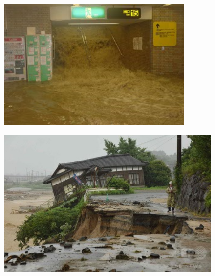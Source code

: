 \documentclass[12pt,dvipdfmx]{beamer}
\begin{document}
{\begin{minipage}{0.6\columnwidth}
\begin{beamerboxesrounded}
\begin{itemize}
        \end{itemize}
      \end{beamerboxesrounded}
      \end{minipage}
      \begin{minipage}{0.39\columnwidth}
        \centering
        \bigskip
        \begin{figure}[htbp]
          \includegraphics[scale=0.54]{hukuoka.pdf}
        \end{figure}
        \begin{figure}[H]
          \footnotesize
          \includegraphics[scale=0.32]{kyusyu.pdf}
        \end{figure}
      \end{minipage}
      
          


    }
\frame
\end{document}
